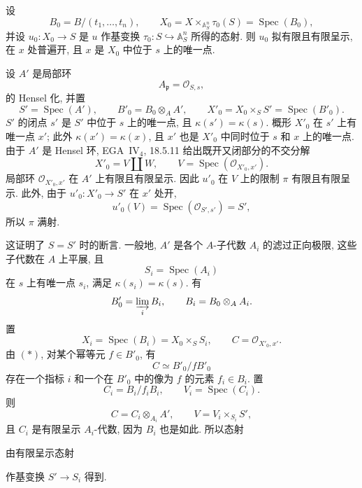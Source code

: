 设
\[
  B_0=B/(t_1,\ldots,t_n),\qquad
  X_0=X\times_{\mathbb A^n_S}\tau_0(S)
      =\operatorname{Spec}(B_0),
\]
并设 \(u_0:X_0\to S\) 是 \(u\) 作基变换
\(\tau_0:S\hookrightarrow\mathbb A^n_S\) 所得的态射.
则 \(u_0\) 拟有限且有限呈示, 在 \(x\) 处普遍开,
且 \(x\) 是 \(X_0\) 中位于 \(s\) 上的唯一点.

设 \(A'\) 是局部环
\[
  A_{\mathfrak p}=\mathcal O_{S,s},
\]
的 Hensel 化, 并置
\[
  S'=\operatorname{Spec}(A'),\qquad
  B'_0=B_0\otimes_A A',\qquad
  X'_0=X_0\times_S S'=\operatorname{Spec}(B'_0).
\]
\(S'\) 的闭点 \(s'\) 是 \(S'\) 中位于 \(s\) 上的唯一点,
且 \(\kappa(s')=\kappa(s)\).
概形 \(X'_0\) 在 \(s'\) 上有唯一点 \(x'\);
此外 \(\kappa(x')=\kappa(x)\), 且 \(x'\) 也是 \(X'_0\)
中同时位于 \(s\) 和 \(x\) 上的唯一点.
由于 \(A'\) 是 Hensel 环, EGA~IV\(_4\), 18.5.11 给出既开又闭部分的不交分解
\[
  \tag{*}\label{sga3:vi:lemma:5-6-1:equation:star}
  X'_0=V\amalg W,
  \qquad
  V=\operatorname{Spec}(\mathcal O_{X'_0,x'}).
\]
局部环 \(\mathcal O_{X'_0,x'}\) 在 \(A'\) 上有限且有限呈示.
因此 \(u'_0\) 在 \(V\) 上的限制 \(\pi\) 有限且有限呈示.
此外, 由于 \(u'_0:X'_0\to S'\) 在 \(x'\) 处开,
\[
  u'_0(V)=\operatorname{Spec}(\mathcal O_{S',s'})=S',
\]
所以 \(\pi\) 满射.

这证明了 \(S=S'\) 时的断言. 一般地,
\(A'\) 是各个 \(A\)-子代数 \(A_i\) 的滤过正向极限,
这些子代数在 \(A\) 上平展, 且
\[
  S_i=\operatorname{Spec}(A_i)
\]
在 \(s\) 上有唯一点 \(s_i\), 满足 \(\kappa(s_i)=\kappa(s)\). 有
\[
  B'_0=\varinjlim_i B_i,
  \qquad
  B_i=B_0\otimes_A A_i.
\]
置
\[
  X_i=\operatorname{Spec}(B_i)=X_0\times_S S_i,
  \qquad
  C=\mathcal O_{X'_0,x'}.
\]
由 \((*)\), 对某个幂等元 \(f\in B'_0\), 有
\[
  C\simeq B'_0/fB'_0
\]
存在一个指标 \(i\) 和一个在 \(B'_0\) 中的像为 \(f\) 的元素 \(f_i\in B_i\).
置
\[
  C_i=B_i/f_iB_i,\qquad V_i=\operatorname{Spec}(C_i).
\]
则
\[
  C=C_i\otimes_{A_i}A',
  \qquad
  V=V_i\times_{S_i}S',
\]
且 \(C_i\) 是有限呈示 \(A_i\)-代数, 因为 \(B_i\) 也是如此.
所以态射
\begin{center}
  \label{diag:sga3-VIB-5.6.1-limit-source}%
\end{center}
由有限呈示态射
\begin{center}
  \label{diag:sga3-VIB-5.6.1-limit-descent}%
\end{center}
作基变换 \(S'\to S_i\) 得到.

